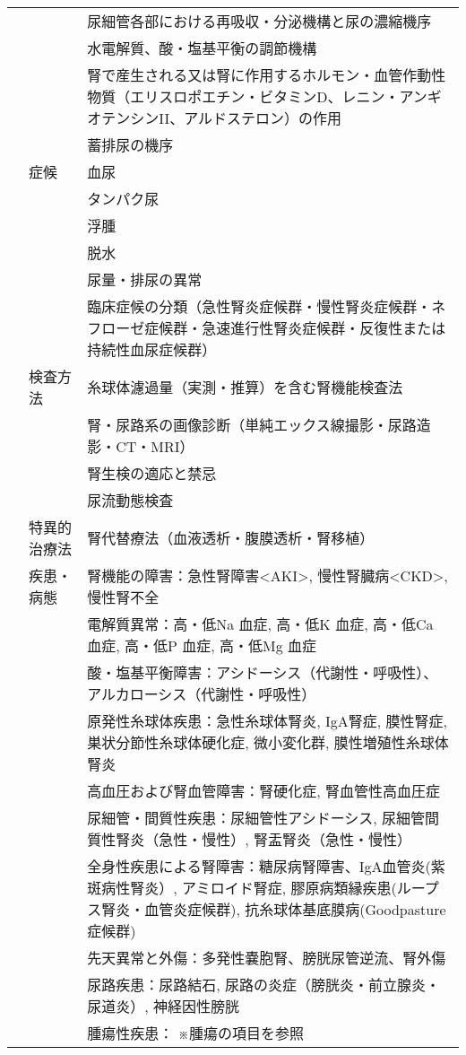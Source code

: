 \documentclass[
]{ltjsarticle}
\begin{document}
\begin{xltabular}{\linewidth}{XXX}
 &  & 尿細管各部における再吸収・分泌機構と尿の濃縮機序 \\
 &  & 水電解質、酸・塩基平衡の調節機構 \\
 &  & 腎で産生される又は腎に作用するホルモン・血管作動性物質（エリスロポエチン・ビタミンD、レニン・アンギオテンシンII、アルドステロン）の作用 \\
 &  & 蓄排尿の機序 \\
 & 症候 & 血尿 \\
 &  & タンパク尿 \\
 &  & 浮腫 \\
 &  & 脱水 \\
 &  & 尿量・排尿の異常 \\
 &  & 臨床症候の分類（急性腎炎症候群・慢性腎炎症候群・ネフローゼ症候群・急速進行性腎炎症候群・反復性または持続性血尿症候群） \\
 & 検査方法 & 糸球体濾過量（実測・推算）を含む腎機能検査法 \\
 &  & 腎・尿路系の画像診断（単純エックス線撮影・尿路造影・CT・MRI） \\
 &  & 腎生検の適応と禁忌 \\
 &  & 尿流動態検査 \\
 & 特異的治療法 & 腎代替療法（血液透析・腹膜透析・腎移植） \\
 & 疾患・病態 & 腎機能の障害：急性腎障害<AKI>, 慢性腎臓病<CKD>, 慢性腎不全 \\
 &  & 電解質異常：高・低Na 血症, 高・低K 血症, 高・低Ca 血症, 高・低P 血症, 高・低Mg 血症 \\
 &  & 酸・塩基平衡障害：アシドーシス（代謝性・呼吸性）、アルカローシス（代謝性・呼吸性） \\
 &  & 原発性糸球体疾患：急性糸球体腎炎, IgA腎症, 膜性腎症, 巣状分節性糸球体硬化症, 微小変化群, 膜性増殖性糸球体腎炎 \\
 &  & 高血圧および腎血管障害：腎硬化症, 腎血管性高血圧症 \\
 &  & 尿細管・間質性疾患：尿細管性アシドーシス, 尿細管間質性腎炎（急性・慢性）, 腎盂腎炎（急性・慢性） \\
 &  & 全身性疾患による腎障害：糖尿病腎障害、IgA血管炎(紫斑病性腎炎）, アミロイド腎症, 膠原病類縁疾患(ループス腎炎・血管炎症候群), 抗糸球体基底膜病(Goodpasture症候群) \\
 &  & 先天異常と外傷：多発性嚢胞腎、膀胱尿管逆流、腎外傷 \\
 &  & 尿路疾患：尿路結石, 尿路の炎症（膀胱炎・前立腺炎・尿道炎）, 神経因性膀胱 \\
 &  & 腫瘍性疾患： ※腫瘍の項目を参照 \\

\end{xltabular}
\end{document}
